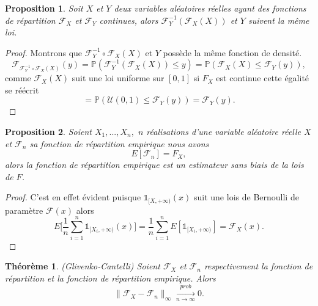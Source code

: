\documentclass[a4paper,11pt]{article}
\numberwithin{equation}{section}
\newtheorem{theorem}{Théorème}[section]
\newtheorem{proposition}{Proposition}
\begin{document}
\begin{proposition}
	Soit $X$ et $Y$ deux variables aléatoires réelles ayant des fonctions de répartition $\mathcal{F}_{X}$ et $\mathcal{F}_{Y}$ continues, alors 
	$\mathcal{F}^{-1}_Y (\mathcal{F}_X(X))$ et $Y$ suivent la même loi. 
\end{proposition}
\begin{proof}
	Montrons que $\mathcal{F}^{-1}_Y \circ \mathcal{F}_X(X)$ et $Y$ possède la même fonction de densité. 
	\[\mathcal{F}_{\mathcal{F}^{-1}_Y \circ \mathcal{F}_X(X)}(y)
	= \mathbb{P}(\mathcal{F}^{-1}_Y (\mathcal{F}_X(X))\leq y )
	= \mathbb{P}(\mathcal{F}_{X}(X) \leq \mathcal{F}_Y(y)),\]
	comme $\mathcal{F}_{X}(X)$ suit une loi uniforme sur $[0,1]$ si $F_X$ est continue cette égalité se réécrit
	\[= \mathbb{P}(\mathcal{U}(0,1) \leq \mathcal{F}_Y(y))=\mathcal{F}_Y(y).\]
\end{proof}
\begin{proposition}
	\label{mean-rep-emp}
	Soient $X_1,...,X_n,$ $n$ réalisations d'une variable aléatoire réelle $X$ et $\mathcal{F}_{n}$ sa fonction de répartition empirique nous avons
	\[E[\mathcal{F}_n]=F_{X},\]
	alors la fonction de répartition empirique est un estimateur sans biais de la lois de $F$. 
\end{proposition}

\begin{proof}
	C'est en effet évident puisque $\mathds{1}_{[X, +\infty )}(x)$ suit une lois de Bernoulli de paramètre $\mathcal{F}(x)$ alors 
	\[E\Big[\frac{1}{n}\sum_{i=1}^{n}\mathds{1}_{[X_i, +\infty )}(x)\Big]= \frac{1}{n}\sum_{i=1}^{n}E[\mathds{1}_{[X_i, +\infty )}]=\mathcal{F}_{X}(x).\]
\end{proof}


\begin{theorem}(Glivenko-Cantelli)
	\label{th:glivenko}
	Soient $\mathcal{F}_{X}$ et $\mathcal{F}_{n}$ respectivement la fonction de répartition et la fonction de répartition empirique. Alors 
	\begin{equation}
		\|\mathcal{F}_{X}-\mathcal{F}_{n}\|_{\infty} \xrightarrow[n\to \infty]{prob} 0.
	\end{equation}
\end{theorem}
\end{document}
